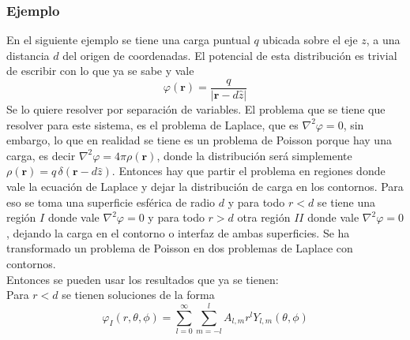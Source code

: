 \subsubsection{Ejemplo}
En el siguiente ejemplo se tiene una carga puntual $q$ ubicada sobre el eje $z$, a una distancia $d$ del origen de coordenadas. El potencial de esta distribución es trivial de escribir con lo que ya se sabe y vale
\begin{equation*}
    \varphi(\textbf{r}) = \frac{q}{|\textbf{r}-d\hat{z}|}
\end{equation*}
Se lo quiere resolver por separación de variables. El problema que se tiene que resolver para este sistema, es el problema de Laplace, que es $\nabla^{2}\varphi = 0$, sin embargo, lo que en realidad se tiene es un problema de Poisson porque hay una carga, es decir $\nabla^{2}\varphi = 4\pi \rho(\textbf{r})$, donde la distribución será simplemente $\rho(\textbf{r}) = q\, \delta (\textbf{r}-d\hat{z})$. Entonces hay que partir el problema en regiones donde vale la ecuación de Laplace y dejar la distribución de carga en los contornos. Para eso se toma una superficie esférica de radio $d$ y para todo $r < d$ se tiene una región $I$ donde vale $\nabla^{2}\varphi = 0$ y para todo $r > d$ otra región $II$ donde vale $\nabla^{2}\varphi = 0$, dejando la carga en el contorno o interfaz de ambas superficies. Se ha transformado un problema de Poisson en dos problemas de Laplace con contornos.\\
\indent Entonces se pueden usar los resultados que ya se tienen:\\
\indent Para $r < d$ se tienen soluciones de la forma
\begin{equation*}
    \varphi_{I}(r,\theta,\phi) = 
    \sum\limits_{l=0}^{\infty}
    \sum\limits_{m = -l}^{l}
    A_{l,m}r^{l}Y_{l,m}(\theta, \phi)
\end{equation*}

